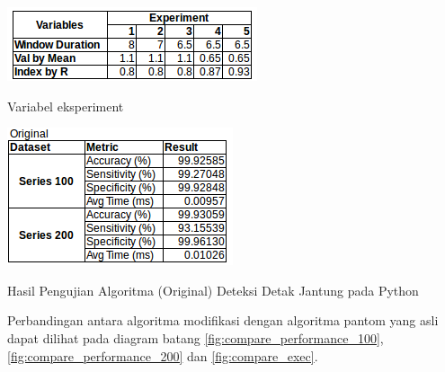 \begin{table}[H]
	\centering
	\includegraphics[scale=0.8]{images/experiment_variable.png}
	\caption{Variabel eksperiment}
	\label{table:experiment_var}
\end{table}

\begin{table}[H]
	\centering
	\includegraphics[scale=0.9]{images/original_beat_detect.png}
	\caption{Hasil Pengujian Algoritma (Original) Deteksi Detak Jantung pada Python}
	\label{fig:original_pantom}
\end{table}

Perbandingan antara algoritma modifikasi dengan algoritma pantom yang asli dapat dilihat pada diagram batang \ref{fig:compare_performance_100}, \ref{fig:compare_performance_200} dan \ref{fig:compare_exec}.


